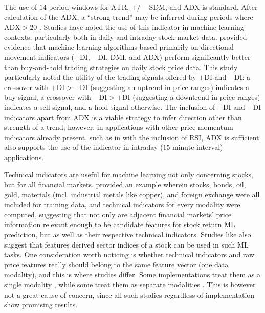\documentclass[stu,floatsintext]{apa7}
\begin{document}
\begin{enumerate}
The use of $14$-period windows for $\text{ATR}$, $+/-\text{SDM}$, and $\text{ADX}$ is standard. After calculation of the $\text{ADX}$, a “strong trend” may be inferred during periods where $\text{ADX}>20$ \parencite{gurrib2018performance}. Studies have noted the use of this indicator in machine learning contexts, particularly both in daily and intraday stock market data. \textcite{saud2022directional} provided evidence that machine learning algorithms based primarily on directional movement indicators ($+\text{DI}$, $-\text{DI}$, $\text{DMI}$, and $\text{ADX}$) perform significantly better than buy-and-hold trading strategies on daily stock price data. This study particularly noted the utility of the trading signals offered by $+\text{DI}$ and $-\text{DI}$: a crossover with $+\text{DI}>-\text{DI}$ (suggesting an uptrend in price ranges) indicates a buy signal, a crossover with $-\text{DI}>+\text{DI}$ (suggesting a downtrend in price ranges) indicates a sell signal, and a hold signal otherwise. The inclusion of $+\text{DI}$ and $-\text{DI}$ indicators apart from $\text{ADX}$ is a viable strategy to infer direction other than strength of a trend; however, in applications with other price momentum indicators already present, such as in \textcite{khan2023performance} with the inclusion of $\text{RSI}$, $\text{ADX}$ is sufficient. \textcite{khan2023performance} also supports the use of the  indicator in intraday ($15$-minute interval) applications.
\end{enumerate}
Technical indicators are useful for machine learning not only concerning stocks, but for all financial markets. \textcite{lohrmann2018classification} provided an example wherein stocks, bonds, oil, gold, materials (incl. industrial metals like copper), and foreign exchange were all included for training data, and technical indicators for every modality were computed, suggesting that not only are adjacent financial markets' price information relevant enough to be candidate features for stock return ML prediction, but as well as their respective technical indicators. Studies like \textcite{wang2014stock} also suggest that features derived sector indices of a stock can be used in such ML tasks. One consideration worth noticing is whether technical indicators and raw price features really should belong to the same feature vector (one data modality), and this is where studies differ. Some implementations treat them as a single modality \parencite{chen2026newsdriven,dashtaki2025hsif}, while some treat them as separate modalities \parencite{fataliyev2023mcasp}. This is however not a great cause of concern, since all such studies regardless of implementation show promising results.
\end{document}
